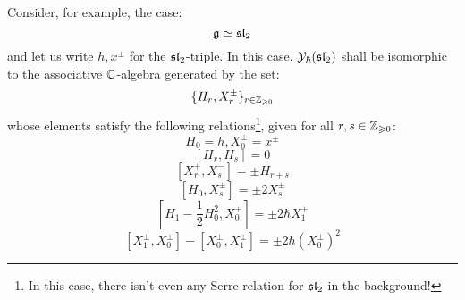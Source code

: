        \begin{example} \label{example: Y(sl_2)}
            Consider, for example, the case:
                $$\g \cong \sl_2$$
            and let us write $h, x^{\pm}$ for the $\sl_2$-triple. In this case, $\calY_{\hbar}(\sl_2)$ shall be isomorphic to the associative $\bbC$-algebra generated by the set:
                $$\{ H_r, X_r^{\pm} \}_{r \in \Z_{\geq 0}}$$
            whose elements satisfy the following relations\footnote{In this case, there isn't even any Serre relation for $\sl_2$ in the background!}, given for all $r, s \in \Z_{\geq 0}$:
                $$H_0 = h, X_0^{\pm} = x^{\pm}$$
                $$[ H_r, H_s ] = 0$$
                $$[ X_r^+, X_s^- ] = \pm H_{r + s}$$
                $$[ H_0, X_s^{\pm} ] = \pm 2 X_s^{\pm}$$
                $$\left[ H_1 - \frac12 H_0^2, X_0^{\pm} \right] = \pm 2 \hbar X_1^{\pm}$$
                $$[ X_1^{\pm}, X_0^{\pm} ] - [ X_0^{\pm}, X_1^{\pm} ] = \pm 2\hbar (X_0^{\pm})^2$$
        \end{example}

